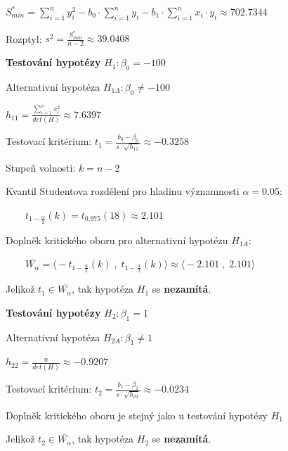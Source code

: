 \documentclass[11pt, a4paper, titlepage]{article}
\begin{document}
\qquad\qquad ${\displaystyle S^*_{min} = \sum_{i=1}^n y_i^2 - b_0 \cdot \sum_{i=1}^n y_i - b_1 \cdot \sum_{i=1}^n x_i \cdot y_i \approx 702.7344}$
\medskip

\qquad Rozptyl: ${\displaystyle s^2 = \frac{S^*_{min}} {n-2} \approx 39.0408}$
\bigskip
\bigskip



\textbf{Testování hypotézy} ${\displaystyle H_1 : \beta_0 = -100}$
\medskip

Alternativní hypotéza ${\displaystyle H_{1A} : \beta_0 \neq -100}$
\medskip

${\displaystyle h_{11} = \frac{\sum\limits_{i=1}^n x_i^2} {det(H)} \approx 7.6397}$
\medskip

Testovací kritérium: ${\displaystyle t_1 = \frac{b_0 - \beta_0}{s \cdot \sqrt{h_{11}}} \approx -0.3258}$
\medskip

Stupeň volnosti: ${\displaystyle k = n - 2}$
\medskip

Kvantil Studentova rozdělení pro hladinu významnosti ${\displaystyle \alpha = 0.05}$:
\medskip

${\displaystyle \qquad t_{1 - \frac{\alpha}{2}}(k) = t_{0.975}(18) \approx 2.101}$
\medskip

Doplněk kritického oboru pro alternativní hypotézu ${\displaystyle H_{1A}}$:
\medskip

${\displaystyle \qquad \overline{W_\alpha} = \big\langle -t_{1 - \frac{\alpha}{2}}(k) \;,\; t_{1 - \frac{\alpha}{2}}(k) \big\rangle \approx \big\langle -2.101 \;,\; 2.101 \big\rangle}$
\medskip

Jelikož ${\displaystyle t_1 \in \overline{W_\alpha}}$, tak hypotéza ${\displaystyle H_1}$  se \textbf{nezamítá}.
\bigskip
\bigskip



\textbf{Testování hypotézy} ${\displaystyle H_2 : \beta_1 = 1}$
\medskip

Alternativní hypotéza ${\displaystyle H_{2A} : \beta_1 \neq 1}$
\medskip

${\displaystyle h_{22} = \frac{n} {det(H)} \approx -0.9207}$
\medskip

Testovací kritérium: ${\displaystyle t_2 = \frac{b_1 - \beta_1}{s \cdot \sqrt{h_{22}}} \approx -0.0234}$
\medskip

Doplněk kritického oboru je stejný jako u testování hypotézy ${\displaystyle H_1}$
\medskip

Jelikož ${\displaystyle t_2 \in \overline{W_\alpha}}$, tak hypotéza ${\displaystyle H_2}$  se \textbf{nezamítá}.
\bigskip
\bigskip
\end{document}
